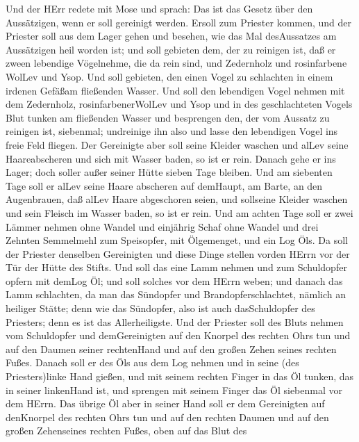  Und der HErr redete mit Mose und sprach:  Das
ist das Gesetz über den Aussätzigen, wenn er soll gereinigt werden.
Ersoll zum Priester kommen,  und der Priester soll aus dem
Lager gehen und besehen, wie das Mal desAussatzes am Aussätzigen heil
worden ist;  und soll gebieten dem, der zu reinigen ist, daß
er zween lebendige Vögelnehme, die da rein sind, und Zedernholz und
rosinfarbene WolLev und Ysop.  Und soll gebieten, den einen
Vogel zu schlachten in einem irdenen Gefäßam fließenden Wasser.
 Und soll den lebendigen Vogel nehmen mit dem Zedernholz,
rosinfarbenerWolLev und Ysop und in des geschlachteten Vogels Blut
tunken am fließenden Wasser  und besprengen den, der vom
Aussatz zu reinigen ist, siebenmal; undreinige ihn also und lasse den
lebendigen Vogel ins freie Feld fliegen.  Der Gereinigte
aber soll seine Kleider waschen und alLev seine Haareabscheren und sich
mit Wasser baden, so ist er rein. Danach gehe er ins Lager; doch soller
außer seiner Hütte sieben Tage bleiben.  Und am siebenten
Tage soll er alLev seine Haare abscheren auf demHaupt, am Barte, an den
Augenbrauen, daß alLev Haare abgeschoren seien, und sollseine Kleider
waschen und sein Fleisch im Wasser baden, so ist er rein. 
Und am achten Tage soll er zwei Lämmer nehmen ohne Wandel und einjährig
Schaf ohne Wandel und drei Zehnten Semmelmehl zum Speisopfer, mit
Ölgemenget, und ein Log Öls.  Da soll der Priester
denselben Gereinigten und diese Dinge stellen vorden HErrn vor der Tür
der Hütte des Stifts.  Und soll das eine Lamm nehmen und
zum Schuldopfer opfern mit demLog Öl; und soll solches vor dem HErrn
weben;  und danach das Lamm schlachten, da man das
Sündopfer und Brandopferschlachtet, nämlich an heiliger Stätte; denn wie
das Sündopfer, also ist auch dasSchuldopfer des Priesters; denn es ist
das Allerheiligste.  Und der Priester soll des Bluts nehmen
vom Schuldopfer und demGereinigten auf den Knorpel des rechten Ohrs tun
und auf den Daumen seiner rechtenHand und auf den großen Zehen seines
rechten Fußes.  Danach soll er des Öls aus dem Log nehmen
und in seine (des Priesters)linke Hand gießen,  und mit
seinem rechten Finger in das Öl tunken, das in seiner linkenHand ist,
und sprengen mit seinem Finger das Öl siebenmal vor dem HErrn.
 Das übrige Öl aber in seiner Hand soll er dem Gereinigten
auf denKnorpel des rechten Ohrs tun und auf den rechten Daumen und auf
den großen Zehenseines rechten Fußes, oben auf das Blut des
